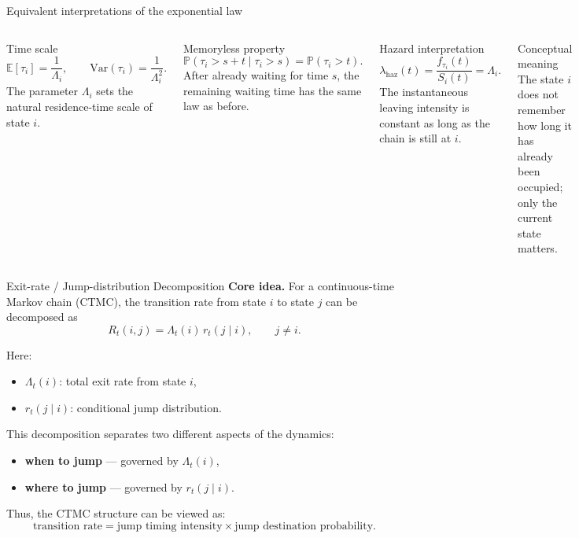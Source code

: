 \documentclass[aspectratio=169,professionalfonts]{beamer}
\newcommand{\Prob}{\mathbb{P}}
\newcommand{\E}{\mathbb{E}}
\begin{document}
\begin{frame}{Equivalent interpretations of the exponential law}
\scriptsize
\begin{columns}[T,totalwidth=\textwidth]
\begin{block}{Time scale}
\[
\E[\tau_i]=\frac{1}{\Lambda_i},
\qquad
\mathrm{Var}(\tau_i)=\frac{1}{\Lambda_i^2}.
\]
The parameter $\Lambda_i$ sets the natural residence-time scale of state $i$.
\end{block}

\begin{alertblock}{Memoryless property}
\[
\Prob(\tau_i>s+t\mid \tau_i>s)=\Prob(\tau_i>t).
\]
After already waiting for time $s$, the remaining waiting time has the same law as before.
\end{alertblock}

\begin{block}{Hazard interpretation}
\[
\lambda_{\mathrm{haz}}(t)=\frac{f_{\tau_i}(t)}{S_i(t)}=\Lambda_i.
\]
The instantaneous leaving intensity is constant as long as the chain is still at $i$.
\end{block}

\begin{alertblock}{Conceptual meaning}
The state $i$ does not remember how long it has already been occupied; only the current state matters.
\end{alertblock}
\end{columns}
\end{frame}

\begin{frame}{Exit-rate / Jump-distribution Decomposition}
\small
\textbf{Core idea.} For a continuous-time Markov chain (CTMC), the transition rate from state $i$ to state $j$ can be decomposed as
\[
R_t(i,j)=\Lambda_t(i)\,r_t(j\mid i), \qquad j\neq i.
\]

Here:
\begin{itemize}
    \item $\Lambda_t(i)$: total exit rate from state $i$,
    \item $r_t(j\mid i)$: conditional jump distribution.
\end{itemize}

This decomposition separates two different aspects of the dynamics:
\begin{itemize}
    \item \textbf{when to jump} --- governed by $\Lambda_t(i)$,
    \item \textbf{where to jump} --- governed by $r_t(j\mid i)$.
\end{itemize}

\medskip
Thus, the CTMC structure can be viewed as:
\[
\text{transition rate}
=
\text{jump timing intensity}
\times
\text{jump destination probability}.
\]

\end{frame}
\end{document}
